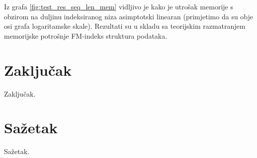 \documentclass[times, utf8, seminar, numeric]{fer}
\begin{document}
Iz grafa \ref{fig:test_res_seq_len_mem} vidljivo je kako je utrošak memorije s obzirom na
duljinu indeksiranog niza asimptotski linearan (primjetimo da su obje osi grafa logaritamske skale).
Rezultati su u skladu sa teorijskim razmatranjem memorijske potrošnje FM-indeks struktura podataka.

\chapter{Zaključak}
Zaključak.




\chapter{Sažetak}
Sažetak.
\end{document}
